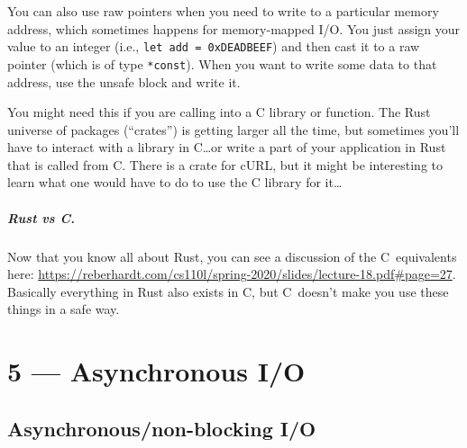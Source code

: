 \documentclass[a4paper]{report}
\newcommand{\CPP}{C\nolinebreak\hspace{-.05em}\raisebox{.4ex}{\tiny\bf +}\nolinebreak\hspace{-.10em}\raisebox{.4ex}{\tiny\bf +}}
\def\CPP{{C\nolinebreak[4]\hspace{-.05em}\raisebox{.4ex}{\tiny\bf ++}}}
\begin{document}
You can also use raw pointers when you need to write to a particular memory address, which sometimes happens for memory-mapped I/O. You just assign your value to an integer (i.e., \texttt{let add = 0xDEADBEEF}) and then cast it to a raw pointer (which is of type \texttt{*const}). When you want to write some data to that address, use the unsafe block and write it.

You might need this if you are calling into a C library or function. The Rust universe of packages (``crates'') is getting larger all the time, but sometimes you'll have to interact with a library in C\ldots or write a part of your application in Rust that is called from C. There is a crate for cURL, but it might be interesting to learn what one would have to do to use the C library for it\ldots

\paragraph{Rust vs \CPP.} Now that you know all about Rust, you can see a discussion of the \CPP~equivalents here: \url{https://reberhardt.com/cs110l/spring-2020/slides/lecture-18.pdf#page=27}. Basically everything in Rust also exists in \CPP, but \CPP~doesn't make you use these things in a safe way.









\chapter*{5 --- Asynchronous I/O}


\section*{Asynchronous/non-blocking I/O}

\begin{center}
\end{center}
\end{document}
